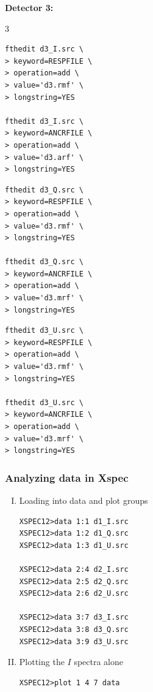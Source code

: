 		\newpage
		\textbf{Detector 3:}
		\begin{multicols}{3}
			\begin{verbatim}
fthedit d3_I.src \
> keyword=RESPFILE \
> operation=add \
> value='d3.rmf' \
> longstring=YES

fthedit d3_I.src \
> keyword=ANCRFILE \
> operation=add \
> value='d3.arf' \
> longstring=YES
			\end{verbatim}
			
			\begin{verbatim}
fthedit d3_Q.src \
> keyword=RESPFILE \
> operation=add \
> value='d3.rmf' \
> longstring=YES

fthedit d3_Q.src \
> keyword=ANCRFILE \
> operation=add \
> value='d3.mrf' \
> longstring=YES
			\end{verbatim}
			
			\begin{verbatim}
fthedit d3_U.src \
> keyword=RESPFILE \
> operation=add \
> value='d3.rmf' \
> longstring=YES

fthedit d3_U.src \
> keyword=ANCRFILE \
> operation=add \
> value='d3.mrf' \
> longstring=YES
			\end{verbatim}
		\end{multicols}
	
	\subsubsection*{Analyzing data in Xspec}
		\begin{enumerate}[I.]
			\item Loading into data and plot groups
			\begin{verbatim}
XSPEC12>data 1:1 d1_I.src
XSPEC12>data 1:2 d1_Q.src
XSPEC12>data 1:3 d1_U.src

XSPEC12>data 2:4 d2_I.src
XSPEC12>data 2:5 d2_Q.src
XSPEC12>data 2:6 d2_U.src

XSPEC12>data 3:7 d3_I.src
XSPEC12>data 3:8 d3_Q.src
XSPEC12>data 3:9 d3_U.src
			\end{verbatim}
			
			\item Plotting the $I$ spectra alone
			\begin{verbatim}
XSPEC12>plot 1 4 7 data
			\end{verbatim}
		\end{enumerate}